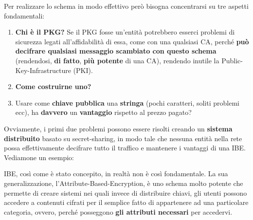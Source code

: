 Per realizzare lo schema in modo effettivo però bisogna concentrarsi su tre aspetti fondamentali:
\begin{enumerate}
    \item \textbf{Chi è il PKG?} Se il PKG fosse un'entità potrebbero esserci problemi di sicurezza legati all'affidabilità di essa, come con una qualsiasi CA, perché \textbf{può decifrare qualsiasi messaggio scambiato con questo schema} (rendendosi, \textbf{di fatto}, \textbf{più potente} di una CA), rendendo inutile la Public-Key-Infrastructure (PKI).
    \item \textbf{Come costruirne uno?} 
    \item Usare come \textbf{chiave pubblica} una \textbf{stringa} (pochi caratteri, soliti problemi ecc), ha \textbf{davvero} un \textbf{vantaggio} rispetto al prezzo pagato?
\end{enumerate}
Ovviamente, i primi due problemi possono essere risolti creando un \textbf{sistema distribuito} basato su secret-sharing, in modo tale che nessuna entità nella rete possa effettivamente decifrare tutto il traffico e mantenere i vantaggi di una IBE. Vediamone un esempio:


\begin{note}
IBE, così come è stato concepito, in realtà non è così fondamentale. La sua generalizzazione, l'Attribute-Based-Encryption, è uno schema molto potente che permette di creare sistemi nei quali invece di distribuire chiavi, gli utenti possono accedere a contenuti cifrati per il semplice fatto di appartenere ad una particolare categoria, ovvero, perché posseggono \textbf{gli attributi necessari} per accedervi.
\end{note}
